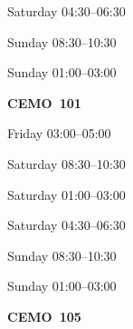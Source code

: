 \documentclass[11pt,oneside,letter]{article}
\begin{document}
\begin{center}
{\large Saturday 04:30--06:30}
\end{center}


\begin{center}
{\large Sunday 08:30--10:30}
\end{center}


\begin{center}
{\large Sunday 01:00--03:00}
\end{center}








\newpage




\begin{center}
{\LARGE {\bf CEMO~101}}
\end{center}

\begin{center}
{\large Friday 03:00--05:00}
\end{center}


\begin{center}
{\large Saturday 08:30--10:30}
\end{center}


\begin{center}
{\large Saturday 01:00--03:00}
\end{center}


\begin{center}
{\large Saturday 04:30--06:30}
\end{center}


\begin{center}
{\large Sunday 08:30--10:30}
\end{center}


\begin{center}
{\large Sunday 01:00--03:00}
\end{center}








\newpage



\begin{center}
{\LARGE {\bf CEMO~105}}
\end{center}
\end{document}
